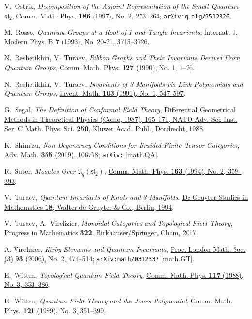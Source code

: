 \documentclass[a4paper,reqno]{amsart}
\theoremstyle{definition}
\theoremstyle{remark}
\newcommand{\fsl}{\mathfrak{sl}}
\newcommand\arxiv[2]{\href{https://arXiv.org/abs/#1}{\texttt{arXiv:\allowbreak #1} #2}}
\newcommand\doi[2]{\href{https://doi.org/#1}{#2}}
\begin{document}
\begin{thebibliography}{99}
 V.~Ostrik,
 \textit{Decomposition of the Adjoint Representation of the Small Quantum $\fsl_2$},
 \doi{10.1007/s002200050109}{Comm. Math. Phys. \textbf{186} (1997), No. 2, 253--264}; 
 \href{https://arxiv.org/abs/q-alg/9512026}{\texttt{arXiv:q-alg/9512026}}.
 
 M.~Rosso,
 \textit{Quantum Groups at a Root of 1 and Tangle Invariants},
 \doi{10.1142/S0217979293003462}{Internat. J. Modern Phys. B \textbf{7} (1993), No. 20-21, 3715--3726.}
 
 N.~Reshetikhin, V.~Turaev,
 \textit{Ribbon Graphs and Their Invariants Derived From Quantum Groups},
 \doi{10.1007/BF02096491}{Comm. Math. Phys. \textbf{127} (1990), No. 1, 1--26}.
 
 N.~Reshetikhin, V.~Turaev,
 \textit{Invariants of 3-Manifolds via Link Polynomials and Quantum Groups},
 \doi{10.1007/BF01239527}{Invent. Math. \textbf{103} (1991), No. 1, 547--597}.
 
 G.~Segal,
 \textit{The Definition of Conformal Field Theory},
 \doi{10.1007/978-94-015-7809-7}{Differential Geometrical Methods in Theoretical Physics (Como, 1987), 165--171, NATO Adv. Sci. Inst. Ser. C Math. Phys. Sci. \textbf{250}, Kluwer Acad. Publ., Dordrecht, 1988}.
 
 K.~Shimizu,
 \textit{Non-Degeneracy Conditions for Braided Finite Tensor Categories},
 \doi{10.1016/j.aim.2019.106778}{Adv. Math. \textbf{355} (2019), 106778};
 \arxiv{1602.06534}{[math.QA]}.

 R.~Suter,
 \textit{Modules Over $\mathfrak{U}_q(\fsl_2)$},
 \doi{10.1007/BF02102012}{Comm. Math. Phys. \textbf{163} (1994), No. 2, 359--393}.
 
 V.~Turaev,
 \textit{Quantum Invariants of Knots and 3-Manifolds},
 \href{https://www.degruyter.com/view/product/461906}{De Gruyter Studies in Mathematics \textbf{18}, Walter de Gruyter \& Co., Berlin, 1994}.
 
 V.~Turaev, A.~Virelizier,
 \textit{Monoidal Categories and Topological Field Theory},
 \doi{10.1007/978-3-319-49834-8}{Progress in Mathematics \textbf{322}, Birkhäuser/Springer, Cham, 2017}.
 
 A. Virelizier,
 \textit{Kirby Elements and Quantum Invariants},
 \doi{10.1112/S0024611506015905}{Proc. London Math. Soc. (3) \textbf{93} (2006), No. 2, 474--514};
 \arxiv{math/0312337}{[math.GT]}.
 
 E.~Witten,
 \textit{Topological Quantum Field Theory},
 \doi{10.1007/BF01223371}{Comm. Math. Phys. \textbf{117} (1988), No. 3, 353--386}.
 
 E.~Witten,
 \textit{Quantum Field Theory and the Jones Polynomial},
 \doi{10.1007/BF01217730}{Comm. Math. Phys. \textbf{121} (1989), No. 3, 351--399}.

\end{thebibliography}
\end{document}
